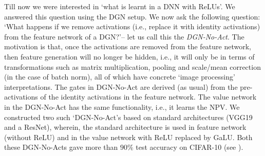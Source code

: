Till now we were interested in `what is learnt in a DNN with ReLUs'. We answered this question using the DGN setup.  We now ask the following question: `What happens if we remove activations (i.e., replace it with identity activations) from the feature network of a DGN?'-- let us call this the \emph{DGN-No-Act}. The motivation is that, once the activations are removed from the feature network, then feature generation will no longer be hidden, i.e., it will only be in terms of transformations such as matrix multiplication, pooling and scale/mean correction (in the case of batch norm), all of which have concrete `image processing'  interpretations. The gates in DGN-No-Act are derived (as usual) from the pre-activations of the identity activations in the feature network. The value network in the DGN-No-Act has the same functionality, i.e., it learns the NPV. We constructed two such `DGN-No-Act's based on standard architectures (VGG19 and a ResNet), wherein, the standard architecture is used in feature network (without ReLU) and in the value network with ReLU replaced by GaLU. Both these DGN-No-Acts gave more than $90\%$ test accuracy on CIFAR-10 (see ).

